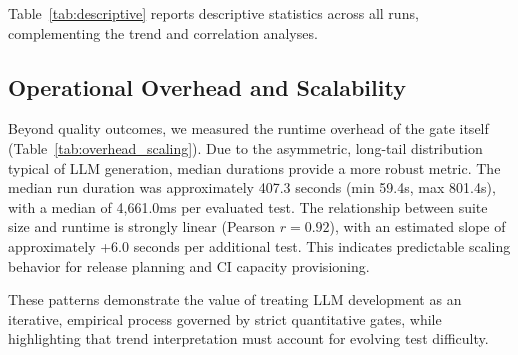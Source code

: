 Table~\ref{tab:descriptive} reports descriptive statistics across all runs, complementing the trend and correlation analyses.


\subsection{Operational Overhead and Scalability}
Beyond quality outcomes, we measured the runtime overhead of the gate itself (Table~\ref{tab:overhead_scaling}). Due to the asymmetric, long-tail distribution typical of LLM generation, median durations provide a more robust metric. The median run duration was approximately 407.3 seconds (min 59.4s, max 801.4s), with a median of 4{,}661.0ms per evaluated test. The relationship between suite size and runtime is strongly linear (Pearson $r=0.92$), with an estimated slope of approximately +6.0 seconds per additional test. This indicates predictable scaling behavior for release planning and CI capacity provisioning.



These patterns demonstrate the value of treating LLM development as an iterative, empirical process governed by strict quantitative gates, while highlighting that trend interpretation must account for evolving test difficulty.
